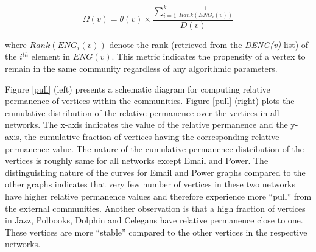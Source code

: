 \begin{equation}
\Omega(v)= \theta(v) \times \frac{\sum_{i=1}^k {\frac{1}{Rank(ENG_i(v))}}}{D(v)}
\end{equation}

where $Rank(ENG_i(v))$ denote the rank (retrieved from the {\it DENG(v)} list) of the $i^{th}$ element in $ENG(v)$. This metric
indicates the propensity of a vertex to remain in the same community regardless of any algorithmic parameters. 


Figure \ref{pull} (left) presents a schematic diagram for computing relative permanence of vertices within the communities. Figure
\ref{pull}
(right)
plots the
cumulative
distribution of the relative permanence over the vertices in all networks. The x-axis indicates the value of the relative permanence and
the
y-axis, the cumulative fraction of vertices having the corresponding relative permanence value.
The nature of the cumulative permanence distribution of the vertices is roughly same for all networks except Email and Power. The
distinguishing nature of the curves for Email and Power graphs compared to the other graphs indicates that very few number of vertices in
these two networks have higher relative permanence values and therefore experience more ``pull'' from the external communities.
 Another observation is that a high fraction of
vertices in Jazz, Polbooks, Dolphin and Celegans have
relative permanence close to one. These vertices are more ``stable'' compared to the other vertices in the respective networks.


 



